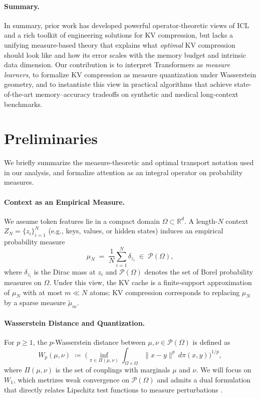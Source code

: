 \documentclass{article}
\theoremstyle{plain}
\theoremstyle{definition}
\theoremstyle{remark}
\newcommand{\R}{\mathbb{R}}
\newcommand{\OmegaSpace}{\Omega} %
\newcommand{\Pspace}{\mathcal{P}(\OmegaSpace)} %
\newcommand{\muN}{\mu_N} %
\newcommand{\tmu}{\tilde{\mu}} %
\newcommand{\Wass}[1]{W_{#1}} %
\begin{document}
\paragraph{Summary.}
In summary, prior work has developed powerful operator-theoretic views of ICL and a rich  
toolkit of engineering solutions for KV compression, but lacks a unifying measure-based  
theory that explains what \emph{optimal} KV compression should look like and how its  
error scales with the memory budget and intrinsic data dimension.  
Our contribution is to interpret Transformers as \emph{measure learners}, to formalize  
KV compression as measure quantization under Wasserstein geometry, and to instantiate  
this view in practical algorithms that achieve state-of-the-art memory--accuracy  
tradeoffs on synthetic and medical long-context benchmarks.


\section{Preliminaries}
\label{sec:prelim}

We briefly summarize the measure-theoretic and optimal transport notation used in our analysis, and formalize attention as an integral operator on probability measures.

\paragraph{Context as an Empirical Measure.}
We assume token features lie in a compact domain $\OmegaSpace \subset \R^d$.  
A length-$N$ context $Z_N = \{z_i\}_{i=1}^N$ (e.g., keys, values, or hidden states) induces an empirical probability measure
\begin{equation}
    \muN \;=\; \frac{1}{N} \sum_{i=1}^N \delta_{z_i} \;\in\; \Pspace,
\end{equation}
where $\delta_{z_i}$ is the Dirac mass at $z_i$ and $\Pspace$ denotes the set of Borel probability measures on $\OmegaSpace$.  
Under this view, the KV cache is a finite-support approximation of $\muN$ with at most $m \ll N$ atoms; KV compression corresponds to replacing $\muN$ by a sparse measure $\tmu_m$.

\paragraph{Wasserstein Distance and Quantization.}
For $p \ge 1$, the $p$-Wasserstein distance between $\mu, \nu \in \Pspace$ is defined as \citep{villani2009optimal}
\begin{equation}
    \Wass{p}(\mu, \nu)
    \;\coloneqq\;
    \Bigg(
    \inf_{\pi \in \Pi(\mu, \nu)}
    \int_{\OmegaSpace \times \OmegaSpace}
    \|x - y\|^p \, d\pi(x, y)
    \Bigg)^{\!1/p},
\end{equation}
where $\Pi(\mu,\nu)$ is the set of couplings with marginals $\mu$ and $\nu$.  
We will focus on $\Wass{1}$, which metrizes weak convergence on $\Pspace$ and admits a dual formulation that directly relates Lipschitz test functions to measure perturbations \citep{villani2009optimal}.  
\end{document}

